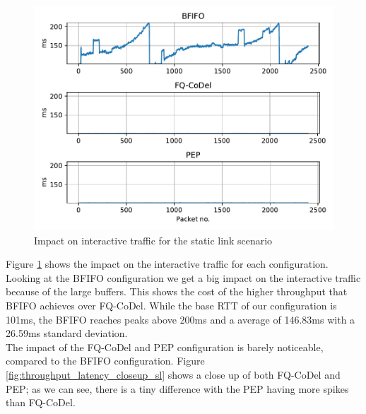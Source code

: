 \documentclass[a4paper,english, 12pt]{report}
\begin{document}
\begin{figure}[!h!] %
	\centering
	\includegraphics[scale=0.70]{../diagrams/witestlab/throughput/throughput_latency_sl.pdf}
  	\caption{Impact on interactive traffic for the static link scenario}
  	\label{fig:throughput_latency_sl}
\end{figure}

Figure \ref{fig:throughput_latency_sl} shows the impact on the interactive traffic for each configuration. 
Looking at the BFIFO configuration we get a big impact on the interactive traffic because of the large buffers. This shows the cost of the higher throughput that BFIFO achieves over FQ-CoDel. While the base RTT of our configuration is 101ms, the BFIFO reaches peaks above 200ms and a average of 146.83ms with a 26.59ms standard deviation.\\

The impact of the FQ-CoDel and PEP configuration is barely noticeable, compared to the BFIFO configuration. Figure \ref{fig:throughput_latency_closeup_sl} shows a close up of both FQ-CoDel and PEP; as we can see, there is a tiny difference with the PEP having more spikes than FQ-CoDel.\\
\end{document}
